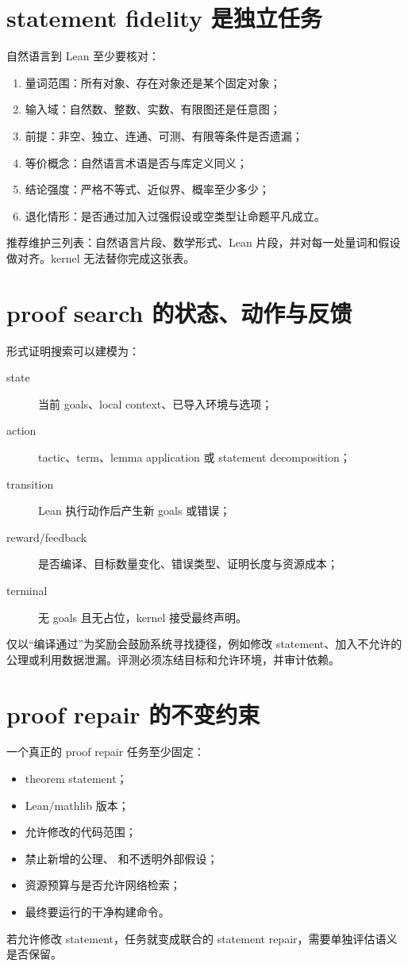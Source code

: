 \section{statement fidelity 是独立任务}

自然语言到 Lean 至少要核对：
\begin{enumerate}
  \item 量词范围：所有对象、存在对象还是某个固定对象；
  \item 输入域：自然数、整数、实数、有限图还是任意图；
  \item 前提：非空、独立、连通、可测、有限等条件是否遗漏；
  \item 等价概念：自然语言术语是否与库定义同义；
  \item 结论强度：严格不等式、近似界、概率至少多少；
  \item 退化情形：是否通过加入过强假设或空类型让命题平凡成立。
\end{enumerate}

推荐维护三列表：自然语言片段、数学形式、Lean 片段，并对每一处量词和假设做对齐。kernel 无法替你完成这张表。

\section{proof search 的状态、动作与反馈}

形式证明搜索可以建模为：
\begin{description}
  \item[state] 当前 goals、local context、已导入环境与选项；
  \item[action] tactic、term、lemma application 或 statement decomposition；
  \item[transition] Lean 执行动作后产生新 goals 或错误；
  \item[reward/feedback] 是否编译、目标数量变化、错误类型、证明长度与资源成本；
  \item[terminal] 无 goals 且无占位，kernel 接受最终声明。
\end{description}

仅以“编译通过”为奖励会鼓励系统寻找捷径，例如修改 statement、加入不允许的公理或利用数据泄漏。评测必须冻结目标和允许环境，并审计依赖。

\section{proof repair 的不变约束}

一个真正的 proof repair 任务至少固定：
\begin{itemize}
  \item theorem statement；
  \item Lean/mathlib 版本；
  \item 允许修改的代码范围；
  \item 禁止新增的公理、 和不透明外部假设；
  \item 资源预算与是否允许网络检索；
  \item 最终要运行的干净构建命令。
\end{itemize}
若允许修改 statement，任务就变成联合的 statement repair，需要单独评估语义是否保留。

